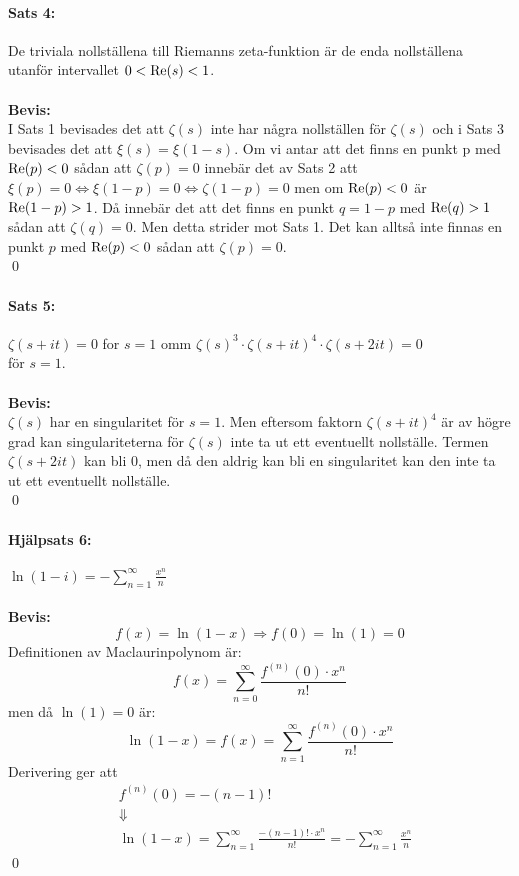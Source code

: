 \documentclass[a4paper]{article}%
\begin{document}
\paragraph{Sats 4:} De triviala nollställena till Riemanns zeta-funktion är de enda nollställena utanför intervallet $0 < \operatorname{Re}(s) < 1$.\\
\\
{\bf Bevis:}\\ %
I Sats 1 bevisades det att $\zeta(s)$ inte har några nollställen för $\zeta(s)$ och i Sats 3 bevisades det att $\xi(s) = \xi(1 - s)$.
Om vi antar att det finns en punkt p med $\operatorname{Re}(p) < 0$ sådan att $\zeta(p) = 0$ innebär det av Sats 2 att $\xi(p) = 0 \Leftrightarrow
\xi(1 - p) = 0 \Leftrightarrow \zeta(1 - p) = 0$ men om $\operatorname{Re}(p) < 0$ är $\operatorname{Re}(1 - p) > 1$. Då innebär det att det finns en punkt
$q = 1 - p$ med $\operatorname{Re}(q) > 1$ sådan att $\zeta(q) = 0$. Men detta strider mot Sats 1. Det kan alltså inte finnas en punkt $p$ med
$\operatorname{Re}(p) < 0$ sådan att $\zeta(p) = 0$. \\
\hfill \qed %

\paragraph{Sats 5:} $\zeta(s + it) = 0$ for $s = 1$ omm $\zeta(s)^3 \cdot \zeta(s + it)^4 \cdot \zeta(s + 2it) = 0$ \\
för $s = 1$. \\
\\
{\bf Bevis:}\\
$\zeta(s)$ har en singularitet för $s = 1$. Men eftersom faktorn $\zeta(s + it)^4$ är av högre grad kan singulariteterna
för $\zeta(s)$ inte ta ut ett eventuellt nollställe. Termen $\zeta(s + 2it)$ kan bli $0$, men då den aldrig kan bli en 
singularitet kan den inte ta ut ett eventuellt nollställe.\\
\hfill\qed\\
\paragraph{Hjälpsats 6:} $\ln(1 - i) = - \sum\limits_{n = 1}^\infty \frac {x^n} n$ \\
\\
{\bf Bevis:}\\
\[
	f(x) = \ln(1 - x) \Rightarrow f(0) = \ln(1) = 0
\]
Definitionen av Maclaurinpolynom är:
\newcommand{\mymac}[1] {
	f(x) = \sum_{n = #1}^\infty \frac {
		f^{(n)}(0) \cdot x^n
	} {
		n!
	}
}
\[
	\mymac{0}
\]
men då $\ln(1) = 0$ är:
\[
	\ln(1 - x) = \mymac{1}
\]
Derivering ger att
\begin{align*}
	&f^{(n)}(0) = -(n - 1)! \\
	&\Downarrow \\ 
	&\ln(1 - x) = \sum_{n = 1}^\infty \frac {-(n - 1)! \cdot x^n} {n!} =
			- \sum_{n = 1}^\infty \frac {x^n} n
\end{align*}
\hfill \qed
\end{document}
